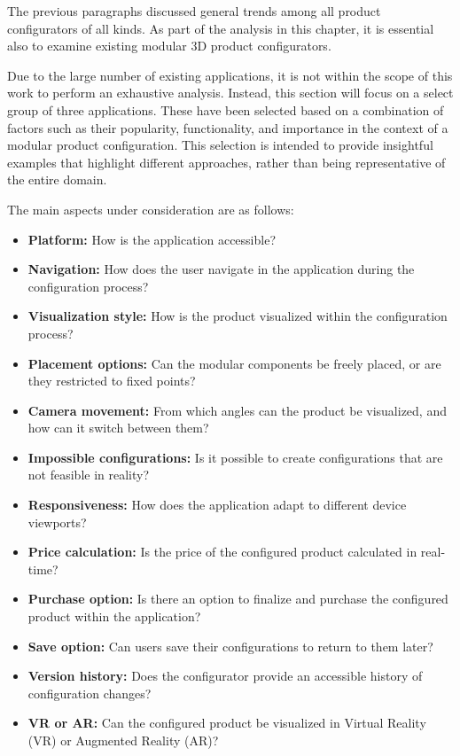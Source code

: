 The previous paragraphs discussed general trends among all product configurators of all kinds. As part of the analysis in this chapter, it is essential also to examine existing modular 3D product configurators. 

Due to the large number of existing applications, it is not within the scope of this work to perform an exhaustive analysis. Instead, this section will focus on a select group of three applications. These have been selected based on a combination of factors such as their popularity, functionality, and importance in the context of a modular product configuration. This selection is intended to provide insightful examples that highlight different approaches, rather than being representative of the entire domain.

\noindent The main aspects under consideration are as follows:\nopagebreak
\begin{itemize}[label=\rectanglebullet]
    \item \textbf{Platform:} How is the application accessible?
    \item \textbf{Navigation:} How does the user navigate in the application during the configuration process?
    \item \textbf{Visualization style:} How is the product visualized within the configuration process?
    \item \textbf{Placement options:} Can the modular components be freely placed, or are they restricted to fixed points?
    \item \textbf{Camera movement:} From which angles can the product be visualized, and how can it switch between them?
    \item \textbf{Impossible configurations:} Is it possible to create configurations that are not feasible in reality?
    \item \textbf{Responsiveness:} How does the application adapt to different device viewports?
    \item \textbf{Price calculation:} Is the price of the configured product calculated in real-time?
    \item \textbf{Purchase option:} Is there an option to finalize and purchase the configured product within the application?
    \item \textbf{Save option:} Can users save their configurations to return to them later?
    \item \textbf{Version history:} Does the configurator provide an accessible history of configuration changes?
    \item \textbf{VR or AR:} Can the configured product be visualized in Virtual Reality (VR) or Augmented Reality (AR)?
\end{itemize}

